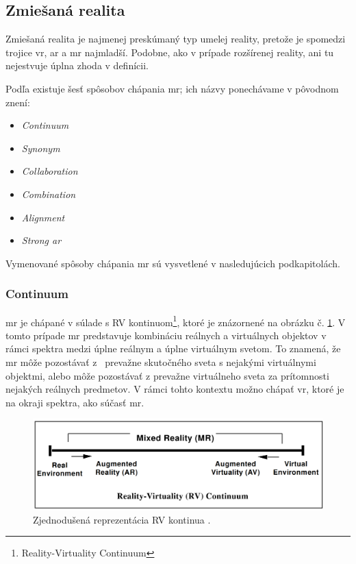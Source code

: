 \subsection{Zmiešaná realita}
Zmiešaná realita je najmenej preskúmaný typ umelej reality, pretože je spomedzi trojice \acrshort{vr}, \acrshort{ar} a \acrshort{mr} najmladší. Podobne, ako v prípade
rozšírenej reality, ani tu nejestvuje úplna zhoda v definícii. 

Podľa \cite{speicherWhatMixedReality2019a} existuje šesť spôsobov chápania \acrshort{mr}; ich názvy ponechávame v pôvodnom znení:
\begin{itemize}
  \item \emph{Continuum}
  \item \emph{Synonym}
  \item \emph{Collaboration}
  \item \emph{Combination}
  \item \emph{Alignment}
  \item \emph{Strong \acrshort{ar}}
\end{itemize}

\noindent Vymenované spôsoby chápania \acrshort{mr} sú vysvetlené v nasledujúcich podkapitolách.

\subsubsection{Continuum}
\acrshort{mr} je chápané v súlade s RV kontinuom\footnote{Reality-Virtuality Continuum}, ktoré je znázornené na obrázku č. \ref{rv-continuum}. V tomto prípade \acrshort{mr}
predstavuje kombináciu reálnych a virtuálnych objektov v rámci spektra medzi úplne reálnym a úplne virtuálnym svetom. To znamená, že \acrshort{mr} môže pozostávať z~
prevažne skutočného sveta s nejakými virtuálnymi objektmi, alebo môže pozostávať z prevažne virtuálneho sveta za prítomnosti nejakých reálnych predmetov. V rámci tohto
kontextu možno chápať \acrshort{vr}, ktoré je na okraji spektra, ako súčasť \acrshort{mr}.

\begin{figure}[!htbp]
  \centering
  \includegraphics[width=12cm]{img/continuum.png}
  \caption{Zjednodušená reprezentácia RV kontinua \cite{milgramAugmentedRealityClass1995}.}
  \label{rv-continuum}
\end{figure}	

